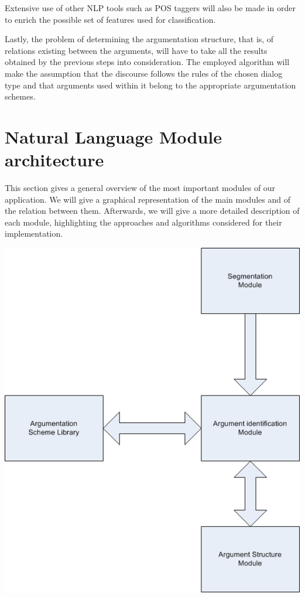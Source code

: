 \par
Extensive use of other NLP tools such as POS taggers will also be made in order to enrich the possible set of features used for classification.
\par
Lastly, the problem of determining the argumentation structure, that is, of relations existing between the arguments, will have to take all the results obtained by the previous steps into consideration. The employed algorithm will make the assumption that the discourse follows the rules of the chosen dialog type and that arguments used within it belong to the appropriate argumentation schemes.

\section{Natural Language Module architecture}
\par
This section gives a general overview of the most important modules of our application. We will give a graphical representation of the main modules and of the relation between them. Afterwards, we will give a more detailed description of each module, highlighting the approaches and algorithms considered for their implementation.

\begin{center}
\includegraphics{NLP_Architecture.png}
\end{center}

